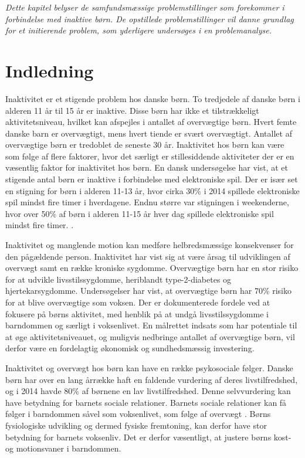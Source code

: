 \textit{Dette kapitel belyser de samfundsmæssige problemstillinger som forekommer i forbindelse med inaktive børn. De opstillede problemstillinger vil danne grundlag for et initierende problem, som yderligere undersøges i en problemanalyse.}

\section{Indledning}
Inaktivitet er et stigende problem hos danske børn. To tredjedele af danske børn i alderen 11 år til 15 år er inaktive\citep{SundhedsstyrrelsenFaktaark}. Disse børn har ikke et tilstrækkeligt aktivitetsniveau, hvilket kan  afspejles i antallet af overvægtige børn. Hvert femte danske barn er overvægtigt, mens hvert tiende er svært overvægtigt.\citep{Universitet2014} Antallet af overvægtige børn er tredoblet de seneste 30 år\citep{Vindum2012}. Inaktivitet hos børn kan være som følge af flere faktorer, hvor det særligt er stillesiddende aktiviteter der er en væsentlig faktor for inaktivitet hos børn. En dansk undersøgelse har vist, at et stigende antal børn er inaktive i forbindelse med elektroniske spil. Der er især set en stigning for børn i alderen 11-13 år, hvor cirka 30\% i 2014 spillede elektroniske spil mindst fire timer i hverdagene. Endnu større var stigningen i weekenderne, hvor over 50\% af børn i alderen 11-15 år hver dag spillede elektroniske spil mindst fire timer. \citep{Universitet2014}. 

Inaktivitet og manglende motion kan medføre helbredsmæssige konsekvenser for den pågældende person. Inaktivitet har vist sig at være årsag til udviklingen af overvægt samt en række kroniske sygdomme. Overvægtige børn har en stor risiko for at udvikle livsstilssygdomme, heriblandt type-2-diabetes og hjertekarsygdomme. Undersøgelser har vist, at overvægtige børn har 70\% risiko for at blive overvægtige som voksen.\citep{Reilly2006} Der er dokumenterede fordele ved at fokusere på børns aktivitet, med henblik på at undgå livsstilssygdomme i barndommen og særligt i voksenlivet. En målrettet indsats som har potentiale til at øge aktivitetsniveauet, og muligvis nedbringe antallet af overvægtige børn, vil derfor være en fordelagtig økonomisk og sundhedsmæssig investering\citep{COWI2015}.

Inaktivitet og overvægt hos børn kan have en række psykosociale følger. Danske børn har over en lang årrække haft en faldende vurdering af deres livstilfredshed, og i 2014 havde 80\% af børnene en lav livstilfredshed\citep{Universitet2014}. Denne selvvurdering kan have betydning for barnets sociale relationer. Barnets sociale relationer kan få følger i barndommen såvel som voksenlivet, som følge af overvægt \citep{StatensInstitutforFolkesundhed2007}. \newline
Børns fysiologiske udvikling og dermed fysiske fremtoning, kan derfor have stor betydning for barnets voksenliv. Det er derfor væsentligt, at justere børns kost- og motionsvaner i barndommen. \newpage

